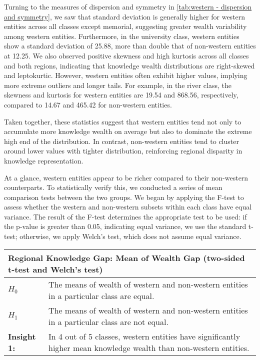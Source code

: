 Turning to the measures of dispersion and symmetry in \autoref{tab:western - dispersion and symmetry}, we saw that standard deviation is generally higher for western entities across all classes except memorial, suggesting greater wealth variability among western entities. Furthermore, in the university class, western entities show a standard deviation of 25.88, more than double that of non-western entities at 12.25. We also observed positive skewness and high kurtosis across all classes and both regions, indicating that knowledge wealth distributions are right-skewed and leptokurtic. However, western entities often exhibit higher values, implying more extreme outliers and longer tails. For example, in the river class, the skewness and kurtosis for western entities are 19.54 and 868.56, respectively, compared to 14.67 and 465.42 for non-western entities.

Taken together, these statistics suggest that western entities tend not only to accumulate more knowledge wealth on average but also to dominate the extreme high end of the distribution. In contrast, non-western entities tend to cluster around lower values with tighter distribution, reinforcing regional disparity in knowledge representation.

At a glance, western entities appear to be richer compared to their non-western counterparts. To statistically verify this, we conducted a series of mean comparison tests between the two groups. We began by applying the F-test to assess whether the western and non-western subsets within each class have equal variance. The result of the F-test determines the appropriate test to be used: if the p-value is greater than 0.05, indicating equal variance, we use the standard t-test; otherwise, we apply Welch’s test, which does not assume equal variance.


\begin{table}[h!]
    \centering
    \renewcommand{\arraystretch}{1.3}
    \begin{tabular}{|l p{12cm}|} 
        \hline
        \multicolumn{2}{|l|}{\textbf{Regional Knowledge Gap: Mean of Wealth Gap (two-sided t-test and Welch's test)}} \\
        \hline
        \textbf{$H_0$} & The means of wealth of western and non-western entities in a particular class are equal. \\
        \textbf{$H_1$} & The means of wealth of western and non-western entities in a particular class are not equal. \\
        \hline
        \textbf{Insight 1:} & In 4 out of 5 classes, western entities have significantly higher mean knowledge wealth than non-western entities. \\
        \hline
    \end{tabular}
\end{table}

